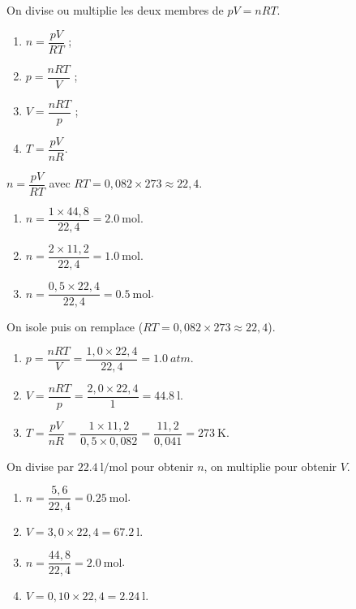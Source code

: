 \documentclass[11pt,a4paper]{article}
\begin{document}
\begin{corrige}
On divise ou multiplie les deux membres de $pV=nRT$.
\begin{enumerate}[label=\alph*)]
  \item $n=\dfrac{pV}{RT}$ ;
  \item $p=\dfrac{nRT}{V}$ ;
  \item $V=\dfrac{nRT}{p}$ ;
  \item $T=\dfrac{pV}{nR}$.
\end{enumerate}
\end{corrige}

\begin{corrige}
$n=\dfrac{pV}{RT}$ avec $RT=0{,}082\times273\approx22{,}4$.
\begin{enumerate}[label=\alph*)]
  \item $n=\dfrac{1\times44{,}8}{22{,}4}=\qty{2.0}{\mole}$.
  \item $n=\dfrac{2\times11{,}2}{22{,}4}=\qty{1.0}{\mole}$.
  \item $n=\dfrac{0{,}5\times22{,}4}{22{,}4}=\qty{0.5}{\mole}$.
\end{enumerate}
\end{corrige}

\begin{corrige}[calculer $p$, $V$ ou $T$]
On isole puis on remplace ($RT=0{,}082\times273\approx22{,}4$).
\begin{enumerate}[label=\alph*)]
  \item $p=\dfrac{nRT}{V}=\dfrac{1{,}0\times22{,}4}{22{,}4}=\qty{1.0}{atm}$.
  \item $V=\dfrac{nRT}{p}=\dfrac{2{,}0\times22{,}4}{1}=\qty{44.8}{\litre}$.
  \item $T=\dfrac{pV}{nR}=\dfrac{1\times11{,}2}{0{,}5\times0{,}082}=\dfrac{11{,}2}{0{,}041}=\qty{273}{\kelvin}$.
\end{enumerate}
\end{corrige}

\begin{corrige}
On divise par $\qty{22.4}{\litre\per\mole}$ pour obtenir $n$, on multiplie pour obtenir $V$.
\begin{enumerate}[label=\alph*)]
  \item $n=\dfrac{5{,}6}{22{,}4}=\qty{0.25}{\mole}$.
  \item $V=3{,}0\times22{,}4=\qty{67.2}{\litre}$.
  \item $n=\dfrac{44{,}8}{22{,}4}=\qty{2.0}{\mole}$.
  \item $V=0{,}10\times22{,}4=\qty{2.24}{\litre}$.
\end{enumerate}
\end{corrige}
\end{document}

